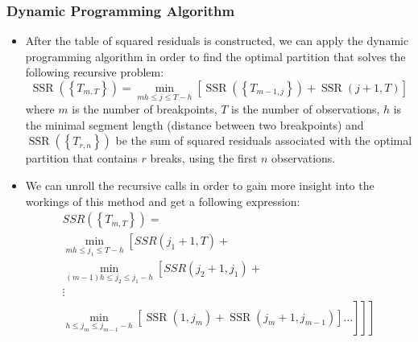 \documentclass[presentation.tex]{subfiles}
\begin{document}
\begin{frame}
  \frametitle{Dynamic Programming Algorithm}
  \begin{itemize}
  \item 
After the table of squared residuals is constructed, we can apply the dynamic
programming algorithm in order to find the optimal partition that solves the
following recursive problem:
\[
\operatorname{SSR}\left(\left\{T_{m, T}\right\}\right)=\min _{m h \leq j \leq
  T-h}\left[\operatorname{SSR}\left(\left\{T_{m-1,
    j}\right\}\right)+\operatorname{SSR}(j+1, T)\right]
\]
where $m$ is the number of breakpoints, $T$ is the number of observations,
$h$ is the minimal segment length (distance between two breakpoints) and
$\operatorname{SSR}\left(\left\{T_{r, n}\right\}\right)$ be the sum of squared
residuals associated with the optimal partition that contains $r$ breaks, using
the first $n$ observations.
\item 
We can unroll the recursive calls in order to gain more insight into the workings of this method
and get a following expression:
\[
\begin{array}{c}
  S S R\left(\left\{T_{m, T}\right\}\right)= \\
  \min _{m h \leq j_{1} \leq T-h}\left[S S R\left(j_{1}+1, T\right)+\right. \\
  \min _{(m-1) h \leq j_{2} \leq j_{1}-h}\left[S S R\left(j_{2}+1, j_{1}\right)+\right. \\
  \vdots \\
  \left.\left.\left.\min _{h \leq j_{m} \leq j_{m-1}-h}
  \left[\operatorname{SSR}\left(1, j_{m}\right)+\operatorname{SSR}\left(j_{m}+1, j_{m-1}\right)\right]
  \ldots\right]\right]\right]
\end{array}
\]
  \end{itemize}
\end{frame}
\end{document}
